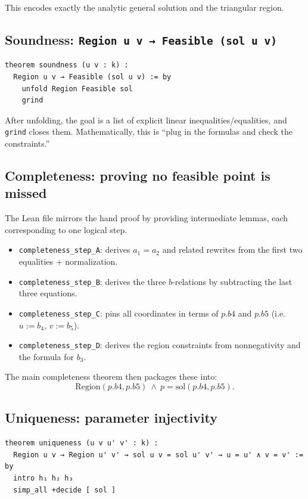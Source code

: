 \documentclass[11pt]{article}
\begin{document}
This encodes exactly the analytic general solution and the triangular region.

\subsection{Soundness: \texttt{Region u v → Feasible (sol u v)}}

\begin{lstlisting}
theorem soundness (u v : k) :
  Region u v → Feasible (sol u v) := by
    unfold Region Feasible sol
    grind
\end{lstlisting}

After unfolding, the goal is a list of explicit linear inequalities/equalities, and \texttt{grind} closes them.
Mathematically, this is ``plug in the formulas and check the constraints.''

\subsection{Completeness: proving no feasible point is missed}

The Lean file mirrors the hand proof by providing intermediate lemmas, each corresponding to one logical step.

\begin{itemize}
\item \texttt{completeness\_step\_A}: derives $a_1=a_2$ and related rewrites from the first two equalities + normalization.
\item \texttt{completeness\_step\_B}: derives the three $b$-relations by subtracting the last three equations.
\item \texttt{completeness\_step\_C}: pins all coordinates in terms of $p.b4$ and $p.b5$ (i.e.\ $u:=b_4$, $v:=b_5$).
\item \texttt{completeness\_step\_D}: derives the region constraints from nonnegativity and the formula for $b_3$.
\end{itemize}

The main completeness theorem then packages these into:
\[
\mathrm{Region}(p.b4,p.b5)\ \wedge\ p=\mathrm{sol}(p.b4,p.b5).
\]

\subsection{Uniqueness: parameter injectivity}

\begin{lstlisting}
theorem uniqueness (u v u' v' : k) :
  Region u v → Region u' v' → sol u v = sol u' v' → u = u' ∧ v = v' := by
  intro h₁ h₂ h₃
  simp_all +decide [ sol ]
\end{lstlisting}
\end{document}
